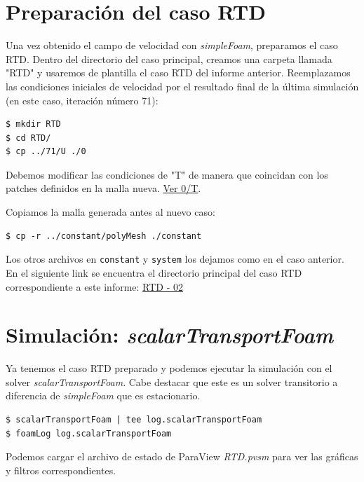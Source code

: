 \documentclass{article}
\begin{document}
\section{Preparación del caso RTD}
Una vez obtenido el campo de velocidad con \textit{simpleFoam}, preparamos el caso RTD. Dentro del directorio del caso principal, creamos una carpeta llamada "RTD" y usaremos de plantilla el caso RTD del informe anterior.
Reemplazamos las condiciones iniciales de velocidad por el resultado final de la última simulación (en este caso, iteración número 71):
\begin{lstlisting}
$ mkdir RTD
$ cd RTD/
$ cp ../71/U ./0
\end{lstlisting}
Debemos modificar las condiciones de "T" de manera que coincidan con los patches definidos en la malla nueva. \href{https://github.com/guillerolle/casos_cfd/tree/master/02/RTD/0/T}{Ver 0/T}.\par
Copiamos la malla generada antes al nuevo caso:
\begin{lstlisting}
$ cp -r ../constant/polyMesh ./constant
\end{lstlisting}

Los otros archivos en \texttt{constant} y \texttt{system} los dejamos como en el caso anterior. En el siguiente link se encuentra el directorio principal del caso RTD correspondiente a este informe: \href{https://github.com/guillerolle/casos_cfd/tree/master/02/RTD}{RTD - 02}

\section{Simulación: \textit{scalarTransportFoam}}
Ya tenemos el caso RTD preparado y podemos ejecutar la simulación con el solver \textit{scalarTransportFoam}. Cabe destacar que este es un solver transitorio a diferencia de \textit{simpleFoam} que es estacionario.

\begin{lstlisting}
$ scalarTransportFoam | tee log.scalarTransportFoam
$ foamLog log.scalarTransportFoam
\end{lstlisting}

Podemos cargar el archivo de estado de ParaView \textit{RTD.pvsm} para ver las gráficas y filtros correspondientes.
\end{document}

